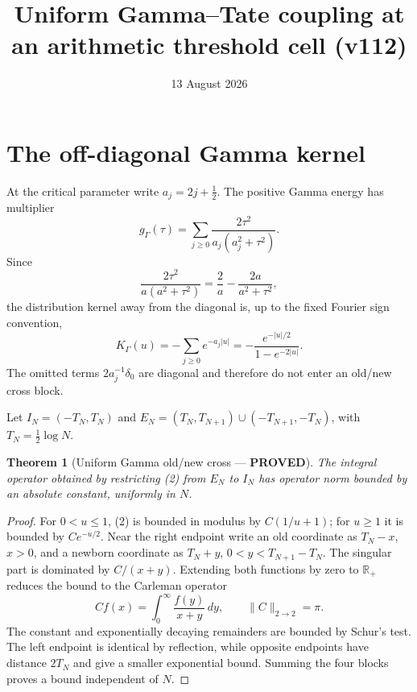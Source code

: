 \documentclass[11pt]{article}
\title{Uniform Gamma--Tate coupling at an arithmetic threshold cell (v112)}
\date{13 August 2026}
\newcommand{\PROVED}{\textcolor{green!40!black}{\textbf{PROVED}}}
\newtheorem{theorem}{Theorem}
\begin{document}
\maketitle

\section{The off-diagonal Gamma kernel}

At the critical parameter write $a_j=2j+\tfrac12$.  The positive Gamma
energy has multiplier
\begin{equation}
 g_\Gamma(\tau)=\sum_{j\ge0}
 \frac{2\tau^2}{a_j(a_j^2+\tau^2)}.                            \tag{1}
\end{equation}
Since
\[
 \frac{2\tau^2}{a(a^2+\tau^2)}=\frac2a-\frac{2a}{a^2+\tau^2},
\]
the distribution kernel away from the diagonal is, up to the fixed Fourier
sign convention,
\begin{equation}
 K_\Gamma(u)=-\sum_{j\ge0}e^{-a_j|u|}
 =-\frac{e^{-|u|/2}}{1-e^{-2|u|}}.                            \tag{2}
\end{equation}
The omitted terms $2a_j^{-1}\delta_0$ are diagonal and therefore do not
enter an old/new cross block.

Let $I_N=(-T_N,T_N)$ and
$E_N=(T_N,T_{N+1})\cup(-T_{N+1},-T_N)$, with
$T_N=\tfrac12\log N$.

\begin{theorem}[Uniform Gamma old/new cross --- \PROVED]
The integral operator obtained by restricting (2) from $E_N$ to $I_N$ has
operator norm bounded by an absolute constant, uniformly in $N$.
\end{theorem}

\begin{proof}
For $0<u\le1$, (2) is bounded in modulus by
$C(1/u+1)$; for $u\ge1$ it is bounded by $Ce^{-u/2}$.  Near the right
endpoint write an old coordinate as $T_N-x$, $x>0$, and a newborn
coordinate as $T_N+y$, $0<y<T_{N+1}-T_N$.  The singular part is dominated
by $C/(x+y)$.  Extending both functions by zero to $\mathbb R_+$ reduces
the bound to the Carleman operator
\[
 Cf(x)=\int_0^\infty\frac{f(y)}{x+y}\,dy,
 \qquad \|C\|_{2\to2}=\pi.
\]
The constant and exponentially decaying remainders are bounded by Schur's
test.  The left endpoint is identical by reflection, while opposite
endpoints have distance $2T_N$ and give a smaller exponential bound.
Summing the four blocks proves a bound independent of $N$.
\end{proof}
\end{document}

